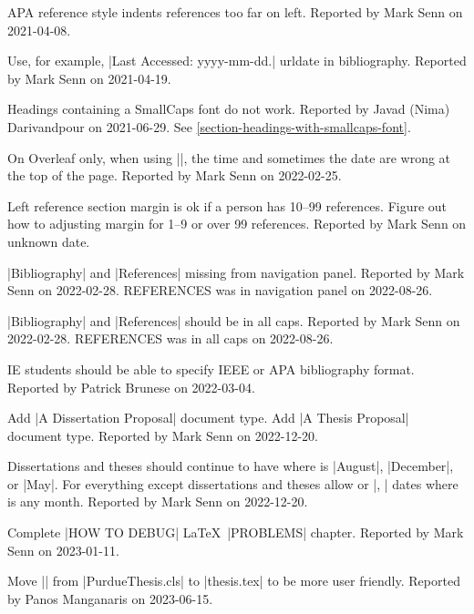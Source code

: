 APA reference style indents references too far on left.
{\small
Reported by Mark Senn on 2021-04-08.%
}

Use, for example, |Last Accessed: yyyy-mm-dd.| urldate in bibliography.
{\small
  Reported by Mark Senn on 2021-04-19.%
}

Headings containing a SmallCaps font do not work.
{\small
  Reported by Javad (Nima) Darivandpour on 2021-06-29.
  See \ref{section-headings-with-smallcaps-font}.%
}

On Overleaf only,
when using
|\def\ZZshowtimestamp{true}|,
the time and sometimes the date
are wrong at the top of the page.
{\small
  Reported by Mark Senn on 2022-02-25.%
}

Left reference section margin is ok if a person has 10--99 references.
{\small
  Figure out how to adjusting margin for 1--9 or over 99 references.
  Reported by Mark Senn on unknown date.
}

|Bibliography| and |References| missing from navigation panel.
{\small
  Reported by Mark Senn on 2022-02-28.
  REFERENCES was in navigation panel on 2022-08-26.
}

|Bibliography| and |References| should be in all caps.
{\small
  Reported by Mark Senn on 2022-02-28.
  REFERENCES was in all caps on 2022-08-26.%
}

IE students should be able
to specify IEEE
or APA bibliography format.
{\small
  Reported by Patrick Brunese on 2022-03-04.%
}

Add |A Dissertation Proposal| document type.
Add |A Thesis Proposal| document type.
{\small
  Reported by Mark Senn on 2022-12-20.%
}

Dissertations and theses should continue to have
  where  is
|August|, |December|, or |May|.
For everything except dissertations and theses allow
 
or
 |, |
dates where  is any month.
{\small
  Reported by Mark Senn on 2022-12-20.%
}

Complete |HOW TO DEBUG| \LaTeX\ |PROBLEMS| chapter.
{\small
  Reported by Mark Senn on 2023-01-11.%
}

Move ||
from |PurdueThesis.cls|
to |thesis.tex|
to be more user friendly.
{\small
  Reported by Panos Manganaris on 2023-06-15.%
}

